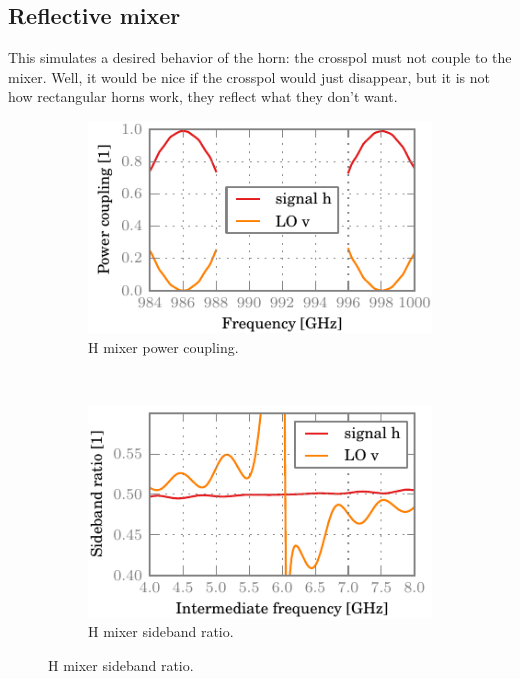 \clearpage
\subsection{Reflective mixer}
This simulates a desired behavior of the horn: the crosspol must not couple to the mixer.
Well, it would be nice if the crosspol would just disappear, but it is not how rectangular horns work, they reflect what they don't want.

\begin{figure}[hbtp]
    \centering
    \begin{subfigure}[b]{.5\textwidth}
        \includegraphics{chapter_3/03_mh_cr_h_dsb}%
        \caption{H mixer power coupling.}
    \end{subfigure}%
    \\
    \begin{subfigure}[b]{.5\textwidth}
        \includegraphics{chapter_3/03_mh_cr_h_sbr}%
        \caption{H mixer sideband ratio.}
    \end{subfigure}%

\end{figure}
